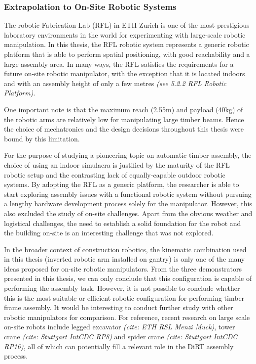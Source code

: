 \documentclass[11pt]{book}
\begin{document}
\subsubsection{Extrapolation to On-Site Robotic Systems}

The robotic Fabrication Lab (RFL) in ETH Zurich is one of the most prestigious laboratory environments in the world for experimenting with large-scale robotic manipulation. In this thesis, the RFL robotic system represents a generic robotic platform that is able to perform spatial positioning, with good reachability and a large assembly area. In many ways, the RFL satisfies the requirements for a future on-site robotic manipulator, with the exception that it is located indoors and with an assembly height of only a few metres \textit{(see 5.2.2 RFL Robotic Platform)}. 

One important note is that the maximum reach (2.55m) and payload (40kg) of the robotic arms are relatively low for manipulating large timber beams. Hence the choice of mechatronics and the design decisions throughout this thesis were bound by this limitation. 

For the purpose of studying a pioneering topic on automatic timber assembly, the choice of using an indoor simulacra is justified by the maturity of the RFL robotic setup and the contrasting lack of equally-capable outdoor robotic systems. By adopting the RFL as a generic platform, the researcher is able to start exploring assembly issues with a functional robotic system without pursuing a lengthy hardware development process solely for the manipulator. However, this also excluded the study of on-site challenges. Apart from the obvious weather and logistical challenges, the need to establish a solid foundation for the robot and the building on-site is an interesting challenge that was not explored. 

In the broader context of construction robotics, the kinematic combination used in this thesis (inverted robotic arm installed on gantry) is only one of the many ideas proposed for on-site robotic manipulators. From the three demonstrators presented in this thesis, we can only conclude that this configuration is capable of performing the assembly task. However, it is not possible to conclude whether this is the most suitable or efficient robotic configuration for performing timber frame assembly. It would be interesting to conduct further study with other robotic manipulators for comparison. For reference, recent research on large scale on-site robots include legged excavator \textit{(cite: ETH RSL Menzi Muck)}, tower crane\textit{ (cite: Stuttgart IntCDC RP8)} and spider crane\textit{ (cite: Stuttgart IntCDC RP16)}, all of which can potentially fill a relevant role in the DiRT assembly process.
\end{document}

